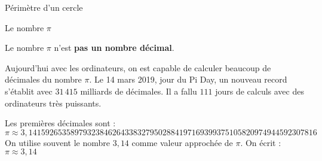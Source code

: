 \begin{pageCours}
\begin{Pp}{Périmètre d'un cercle}
\begin{minipage}{0.7\linewidth}
\end{minipage}
\begin{minipage}{0.28\linewidth}

 
\end{minipage}

\end{Pp}


\begin{DefT}{Le nombre $\pi$}

Le nombre $\pi$\index{$\pi$} n'est \textbf{pas un nombre décimal}.

\end{DefT}

\begin{Rq}
Aujourd'hui avec les ordinateurs, on est capable de calculer beaucoup de décimales du nombre $\pi$. Le 14 mars 2019, jour du Pi Day, un nouveau record s'établit avec \textcolor{sacado_green}{$31\,415$ milliards} de décimales. Il a fallu $111$ jours de calculs avec des ordinateurs très puissants.

Les premières décimales sont :
\[\pi \approx 3,1415926535 8979323846 2643383279 5028841971 6939937510 5820974944
592307816\]
On utilise souvent le nombre $3,14$ comme valeur approchée de $\pi$. On écrit : $\pi \approx 3,14$
\end{Rq}





\end{pageCours}
